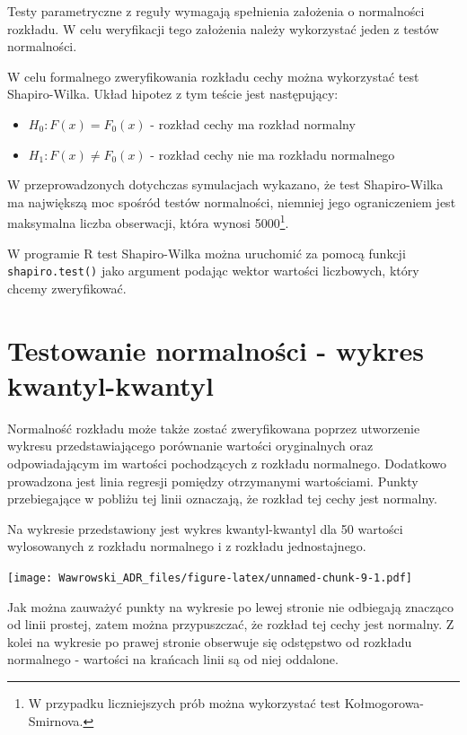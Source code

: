 \documentclass[]{book}
\providecommand{\tightlist}{%
  \setlength{\itemsep}{0pt}\setlength{\parskip}{0pt}}
\let\rmarkdownfootnote\footnote%
\def\footnote{\protect\rmarkdownfootnote}
\begin{document}
Testy parametryczne z reguły wymagają spełnienia założenia o normalności rozkładu. W celu weryfikacji tego założenia należy wykorzystać jeden z testów normalności.

W celu formalnego zweryfikowania rozkładu cechy można wykorzystać test Shapiro-Wilka. Układ hipotez z tym teście jest następujący:

\begin{itemize}
\tightlist
\item
  \(H_0: F(x) = F_0(x)\) - rozkład cechy ma rozkład normalny
\item
  \(H_1: F(x) \neq F_0(x)\) - rozkład cechy nie ma rozkładu normalnego
\end{itemize}

W przeprowadzonych dotychczas symulacjach wykazano, że test Shapiro-Wilka ma największą moc spośród testów normalności, niemniej jego ograniczeniem jest maksymalna liczba obserwacji, która wynosi 5000\footnote{W przypadku liczniejszych prób można wykorzystać test Kołmogorowa-Smirnova.}.

W programie R test Shapiro-Wilka można uruchomić za pomocą funkcji \texttt{shapiro.test()} jako argument podając wektor wartości liczbowych, który chcemy zweryfikować.

\hypertarget{testowanie-normalnosci---wykres-kwantyl-kwantyl}{%
\section{Testowanie normalności - wykres kwantyl-kwantyl}\label{testowanie-normalnosci---wykres-kwantyl-kwantyl}}

Normalność rozkładu może także zostać zweryfikowana poprzez utworzenie wykresu przedstawiającego porównanie wartości oryginalnych oraz odpowiadającym im wartości pochodzących z rozkładu normalnego. Dodatkowo prowadzona jest linia regresji pomiędzy otrzymanymi wartościami. Punkty przebiegające w pobliżu tej linii oznaczają, że rozkład tej cechy jest normalny.

Na wykresie przedstawiony jest wykres kwantyl-kwantyl dla 50 wartości wylosowanych z rozkładu normalnego i z rozkładu jednostajnego.

\texttt{[image: Wawrowski\_ADR\_files/figure-latex/unnamed-chunk-9-1.pdf]}

Jak można zauważyć punkty na wykresie po lewej stronie nie odbiegają znacząco od linii prostej, zatem można przypuszczać, że rozkład tej cechy jest normalny. Z kolei na wykresie po prawej stronie obserwuje się odstępstwo od rozkładu normalnego - wartości na krańcach linii są od niej oddalone.
\end{document}
